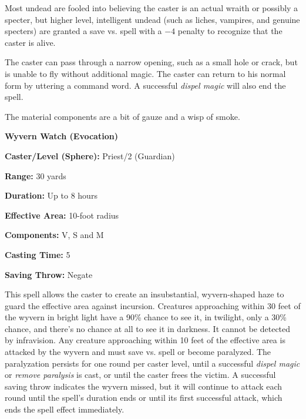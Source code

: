 \begin{multicols}{2}
Most undead are fooled into believing the caster is an actual wraith or possibly a specter, but higher level, intelligent undead (such as liches, vampires, and genuine specters) are granted a save vs. spell with a $-4$ penalty to recognize that the caster is alive.

The caster can pass through a narrow opening, such as a small hole or crack, but is unable to fly without additional magic.  The caster can return to his normal form by uttering a command word.  A successful \textit{dispel magic} will also end the spell.

The material components are a bit of gauze and a wisp of smoke.

\vspace{1em}

\noindent
\begin{minipage}{\columnwidth}

\noindent \textbf{Wyvern Watch (Evocation)}

\noindent \textbf{Caster/Level (Sphere):} Priest/2 (Guardian)

\noindent \textbf{Range:} 30 yards

\noindent \textbf{Duration:} Up to 8 hours

\noindent \textbf{Effective Area:} 10-foot radius

\noindent \textbf{Components:} V, S and M

\noindent \textbf{Casting Time:} 5

\noindent \textbf{Saving Throw:} Negate

\end{minipage}

This spell allows the caster to create an insubstantial, wyvern-shaped haze to guard the effective area against incursion.  Creatures approaching within 30 feet of the wyvern in bright light have a 90\% chance to see it, in twilight, only a 30\% chance, and there's no chance at all to see it in darkness.  It cannot be detected by infravision.  Any creature approaching within 10 feet of the effective area is attacked by the wyvern and must save vs. spell or become paralyzed.  The paralyzation persists for one round per caster level, until a successful \textit{dispel magic} or \textit{remove paralysis} is cast, or until the caster frees the victim.  A successful saving throw indicates the wyvern missed, but it will continue to attack each round until the spell's duration ends or until its first successful attack, which ends the spell effect immediately.


\end{multicols}

